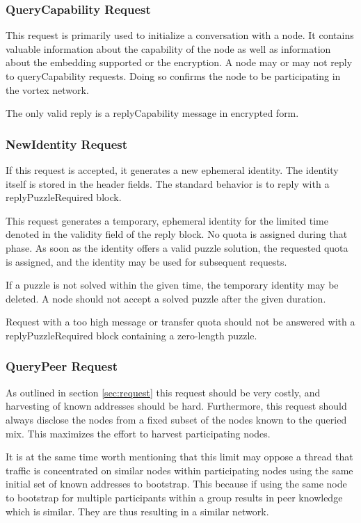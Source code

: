 \subsubsection{QueryCapability Request}
This request is primarily used to initialize a conversation with a node. It contains valuable information about the capability of the node as well as information about the embedding supported or the encryption. A node may or may not reply to queryCapability requests. Doing so confirms the node to be participating in the vortex network.

The only valid reply is a replyCapability message in encrypted form.

\subsubsection{NewIdentity Request}
If this request is accepted, it generates a new ephemeral identity. The identity itself is stored in the header fields. The standard behavior is to reply with a replyPuzzleRequired block. 

This request generates a temporary, ephemeral identity for the limited time denoted in the validity field of the reply block. No quota is assigned during that phase. As soon as the identity offers a valid puzzle solution, the requested quota is assigned, and the identity may be used for subsequent requests.

If a puzzle is not solved within the given time, the temporary identity may be deleted. A node should not accept a solved puzzle after the given duration. 

Request with a too high message or transfer quota should not be answered with a replyPuzzleRequired block containing a zero-length puzzle.

\subsubsection{QueryPeer Request}
As outlined in section \ref{sec:request} this request should be very costly, and harvesting of known addresses should be hard. Furthermore, this request should always disclose the nodes from a fixed subset of the nodes known to the queried mix. This maximizes the effort to harvest participating nodes.

It is at the same time worth mentioning that this limit may oppose a thread that traffic is concentrated on similar nodes within participating nodes using the same initial set of known addresses to bootstrap. This because if using the same node to bootstrap for multiple participants within a group results in peer knowledge which is similar. They are thus resulting in a similar network. 

